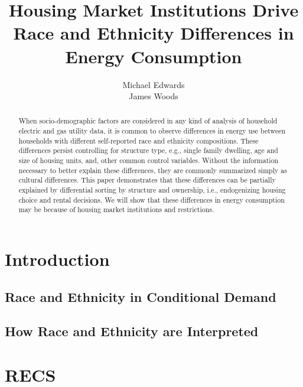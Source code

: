 \documentclass{article}
\author{Michael Edwards\\ 
  James Woods}
\title{Housing Market Institutions Drive Race and Ethnicity Differences in Energy Consumption}
\begin{document}
\maketitle


\begin{abstract}

When socio-demographic factors are considered in any kind of analysis of household electric and gas utility data, it is common to observe differences in energy use between households with different self-reported race and ethnicity compositions. These differences persist controlling for structure type, e.g., single family dwelling, age and size of housing units, and, other common control variables. Without the information necessary to better explain these differences, they are commonly summarized simply as cultural differences. This paper demonstrates that these differences can be partially explained by differential sorting by structure and ownership, i.e., endogenizing housing choice and rental decisions. We will show that these differences in energy consumption may be because of housing market institutions and restrictions.
\end{abstract}

\section{Introduction}

\cite{RBase}




  \subsection{Race and Ethnicity in Conditional Demand}
  \subsection{How Race and Ethnicity are Interpreted}

\section{RECS}
\end{document}
